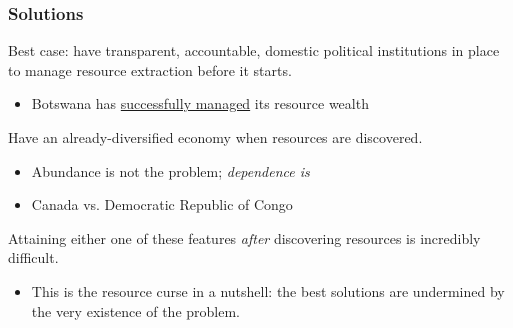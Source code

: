 \documentclass[handout]{beamer}
\begin{document}
\begin{frame} 
	\frametitle{\LARGE{Solutions}}
	\begin{itemize}
		\large{
			\item Best case: have transparent, accountable, domestic political institutions in place to manage resource extraction before it starts. \pause
			\begin{itemize}
				\item Botswana has \href{https://openknowledge.worldbank.org/handle/10986/18304}{successfully managed} its resource wealth\pause
			\end{itemize}
			
			\item Have an already-diversified economy when resources are discovered. \pause
			\begin{itemize}
				\item Abundance is not the problem; \textit{dependence is} \pause
				\item Canada vs. Democratic Republic of Congo\pause
			\end{itemize}
			
			\item Attaining either one of these features \textit{after} discovering resources is incredibly difficult. \pause
			\begin{itemize}
				\item This is the resource curse in a nutshell: the best solutions are undermined by the very existence of the problem. 
			\end{itemize}
		}
	\end{itemize}
\end{frame}
\end{document}
